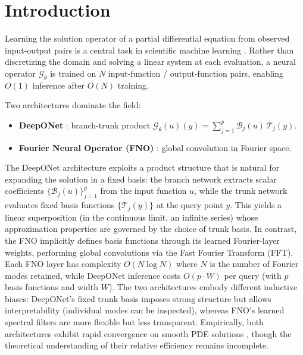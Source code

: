 \documentclass[12pt,a4paper]{article}
\begin{document}
\clearpage
{}
\tableofcontents
\clearpage
{}

\section{Introduction}
\label{sec:intro}

Learning the solution operator of a partial differential equation from observed
input-output pairs is a central task in scientific machine learning
\citep{kovachki2023neuralop,kovachki2024operator,lu2021deeponet,li2020fno}.
Rather than discretizing the domain and solving a linear system at each evaluation,
a neural operator $\mathcal{G}_\theta$ is trained on $N$ input-function /
output-function pairs, enabling $O(1)$ inference after $O(N)$ training.

Two architectures dominate the field:
\begin{itemize}
    \item \textbf{DeepONet} \citep{lu2021deeponet}: branch-trunk product
        $\mathcal{G}_\theta(u)(y) = \sum_{j=1}^p \mathcal{B}_j(u)\,\mathcal{T}_j(y)$.
    \item \textbf{Fourier Neural Operator (FNO)} \citep{li2020fno}: global convolution
        in Fourier space.
\end{itemize}

The DeepONet architecture exploits a product structure that is natural for
expanding the solution in a fixed basis: the branch network extracts scalar
coefficients $\{\mathcal{B}_j(u)\}_{j=1}^p$ from the input function $u$, while
the trunk network evaluates fixed basis functions $\{\mathcal{T}_j(y)\}$ at the
query point $y$.  This yields a linear superposition (in the continuous limit,
an infinite series) whose approximation properties are governed by the
choice of trunk basis.  In contrast, the FNO implicitly defines basis functions
through its learned Fourier-layer weights, performing global convolutions via the
Fast Fourier Transform (FFT).  Each FNO layer has complexity $O(N \log N)$ where
$N$ is the number of Fourier modes retained, while DeepONet inference costs
$O(p \cdot W)$ per query (with $p$ basis functions and width $W$).  The two
architectures embody different inductive biases: DeepONet's fixed trunk basis
imposes strong structure but allows interpretability (individual modes can be
inspected), whereas FNO's learned spectral filters are more flexible but less
transparent.  Empirically, both architectures exhibit rapid convergence on
smooth PDE solutions \citep{li2020fno,lu2021deeponet}, though the theoretical
understanding of their relative efficiency remains incomplete.
\end{document}
